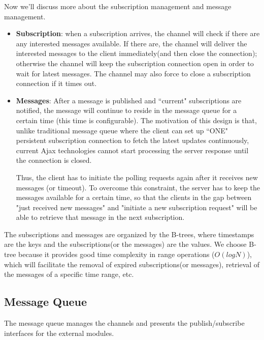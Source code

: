 Now we'll discuss more about the subscription management and message management.
\begin{itemize}
    \item {\bf Subscription}: when a subscription arrives, the channel will
          check if there are any interested messages available. If there are, 
          the channel will deliver the interested messages to the client 
          immediately(and then close the connection); otherwise the channel 
          will keep the subscription 
          connection open in order to wait for latest messages. The channel may
          also force to close a subscription connection if it times out. 
    \item {\bf Messages}: After a message is published and 
            ``current" subscriptions are notified, the message will continue to 
            reside in the message queue for a certain time (this time is 
            configurable). The motivation of this design is that, unlike 
            traditional message queue where the client can set up ``ONE" 
            persistent subscription connection to fetch the latest updates
            continuously, current Ajax technologies cannot start processing
            the server response until the connection is closed.

            Thus, the client has to initiate the polling requests again after it
            receives new messages (or timeout).  
            To overcome this constraint, the server has to keep the messages
            available for a certain time, so that the clients in the gap 
            between "just received new messages" and "initiate a new subscription
            request" will be able to retrieve that message in the next subscription.
\end{itemize}

The subscriptions and messages are organized by the B-trees\cite{BTree}, where
timestamps are the keys and the subscriptions(or the messages) are the values.
We choose B-tree because it provides good time complexity in range operations
($O(log N)$), which will facilitate the removal of expired subscriptions(or
messages), retrieval of the messages of a specific time range, etc.

\subsection{Message Queue\\}

The message queue manages the channels and presents the publish/subscribe 
interfaces for the external modules.

